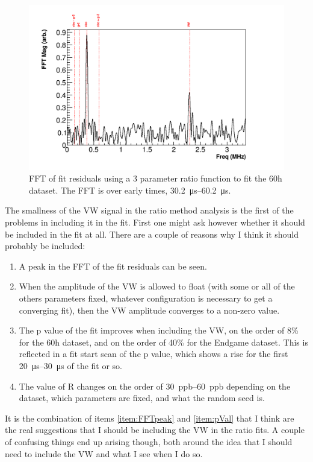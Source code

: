 \documentclass[12pt,letterpaper]{article}
\begin{document}
\begin{figure}[]
    \centering
    \includegraphics[width=.8\textwidth]{FFT_3param_earlyTimes}
    \caption[]{FFT of fit residuals using a 3 parameter ratio function to fit the 60h dataset. The FFT is over early times, \SIrange{30.2}{60.2}{\micro s}.}
    \label{fig:FFT_3param_earlyTimes}
\end{figure}


The smallness of the VW signal in the ratio method analysis is the first of the problems in including it in the fit. First one might ask however whether it should be included in the fit at all. There are a couple of reasons why I think it should probably be included:
\begin{enumerate}
	\item\label{item:FFTpeak}{A peak in the FFT of the fit residuals can be seen.}
	\item\label{item:VWamp}{When the amplitude of the VW is allowed to float (with some or all of the others parameters fixed, whatever configuration is necessary to get a converging fit), then the VW amplitude converges to a non-zero value.}
	\item\label{item:pVal}{The p value of the fit improves when including the VW, on the order of 8\% for the 60h dataset, and on the order of 40\% for the Endgame dataset. This is reflected in a fit start scan of the p value, which shows a rise for the first \SIrange{20}{30}{\micro s} of the fit or so.}
	\item\label{item:Rchange}{The value of R changes on the order of \SIrange{30}{60}{ppb} depending on the dataset, which parameters are fixed, and what the random seed is.}
\end{enumerate}
It is the combination of items \ref{item:FFTpeak} and \ref{item:pVal} that I think are the real suggestions that I should be including the VW in the ratio fits. A couple of confusing things end up arising though, both around the idea that I should need to include the VW and what I see when I do so.
\end{document}
